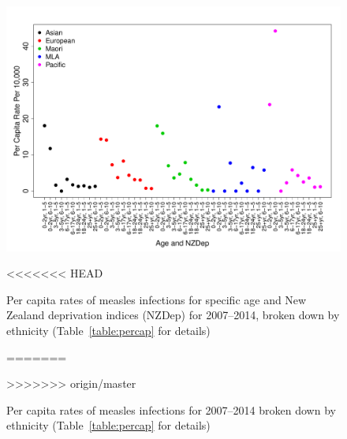 \documentclass{article}
\begin{document}
\begin{itemize}
\begin{figure}
\begin{center}
\includegraphics{draftfinalreport-010}
\end{center}
<<<<<<< HEAD
\caption{Per capita rates of measles infections for specific age and New Zealand deprivation indices (NZDep) for 2007--2014, broken down by ethnicity (Table~\ref{table:percap} for details)}
=======
\caption{Per capita rates of measles infections for 2007--2014 broken down by ethnicity (Table~\ref{table:percap} for details)}
>>>>>>> origin/master
\label{fig:percap}
\end{figure}


\end{itemize}
\end{document}
